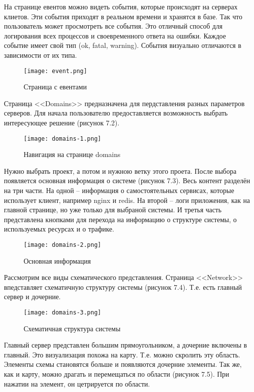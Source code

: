На странице евентов можно видеть события, которые происходят на серверах клиетов. Эти события приходят в реальном времени и хранятся в базе. Так что пользователь может просмотреть все события. Это отличный способ для логирования всех процессов и своевременного ответа на ошибки. Каждое событие имеет свой тип (ok, fatal, warning). События визуально отличаются в зависимости от их типа. 

\begin{figure}[h!]
\centering
	\texttt{[image: event.png]}
	\caption{Страница с евентами}
	\clearpage
\end{figure}

Страница <<Domains>> предназначена для пердставления разных параметров серверов. Для начала пользователю предоставляется возможность выбрать интересующее решение (рисунок 7.2). \linebreak

\begin{figure}[h!]
\centering
	\texttt{[image: domains-1.png]}
	\caption{Навигация на странице domains}
	\clearpage
\end{figure}

Нужно выбрать проект, а потом и нужною ветку этого проета. После выбора появляется основная информация о системе (рисунок 7.3). Весь контент разделён на три части. На одной – информация о самостоятельных сервисах, которые использует клиент, например nginx и redis. На второй – логи приложения, как на главной странице, но уже только для выбраной системы. И третья часть представлена кнопками для перехода на информацию о структуре системы, о используемых ресурсах и о трафике.

\begin{figure}[h!]
\centering
	\texttt{[image: domains-2.png]}
	\caption{Основная информация}
	\clearpage
\end{figure}

Рассмотрим все виды схематического представления. Страница <<Network>> впедставляет схематичную структуру системы (рисунок 7.4). Т.е. есть главный сервер и дочерние. 

\begin{figure}[h!]
\centering
	\texttt{[image: domains-3.png]}
	\caption{Схематичная структура системы}
	\clearpage
\end{figure}

Главный сервер представлен большим прямоугольником, а дочерние включены в главный. Это визуализация похожа на карту. Т.е. можно скролить эту область. Элементы схемы становятся больше и появляются дочерние элементы. Так же, как и карту, можно драгать и перемещаться по области (рисунок 7.5). При нажатии на элемент, он цетрируется по области. 

